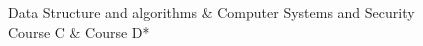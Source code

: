 
\begin{cvcourses}
    Data Structure and algorithms & Computer Systems and Security \\
    Course C & Course D*
\end{cvcourses}
